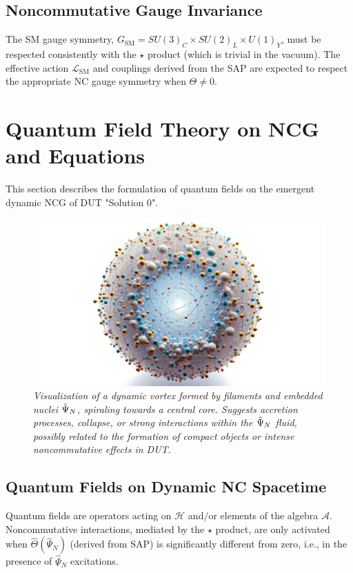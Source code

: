 \documentclass[11pt, a4paper]{article}
\theoremstyle{remark}
\newcommand{\Op}[1]{\hat{#1}}
\begin{document}
\subsection{Noncommutative Gauge Invariance}
\label{subsec:nc_gauge_invariance_final}
The SM gauge symmetry, \(G_{\text{SM}} = SU(3)_C \times SU(2)_L \times U(1)_Y\), must be respected consistently with the \( \star \) product (which is trivial in the vacuum). The effective action \( \mathcal{L}_{\text{SM}} \) and couplings derived from the SAP are expected to respect the appropriate NC gauge symmetry when \( \Theta \neq 0 \).

\section{Quantum Field Theory on NCG and Equations}
\label{sec:qft_nc_final}

This section describes the formulation of quantum fields on the emergent dynamic NCG of DUT "Solution 0".

\begin{figure}[htbp]
    \centering
    \includegraphics[width=0.5\linewidth]{OIG14.ZNLJ.PNG}
    \caption{%
      \footnotesize\textit{Visualization of a dynamic vortex formed by filaments and embedded nuclei \(\protect\Op{\Psi}_N\), spiraling towards a central core. Suggests accretion processes, collapse, or strong interactions within the \(\protect\Op{\Psi}_N\) fluid, possibly related to the formation of compact objects or intense noncommutative effects in DUT.}
    }
    \label{fig:Figura7}
\end{figure}

\subsection{Quantum Fields on Dynamic NC Spacetime}
\label{subsec:qft_fields_final_revised}
Quantum fields are operators acting on \( \mathcal{H} \) and/or elements of the algebra \( \mathcal{A} \). Noncommutative interactions, mediated by the \( \star \) product, are only activated when \( \Op{\Theta}(\Op{\Psi}_N) \) (derived from SAP) is significantly different from zero, i.e., in the presence of \( \Op{\Psi}_N \) excitations.
\end{document}
